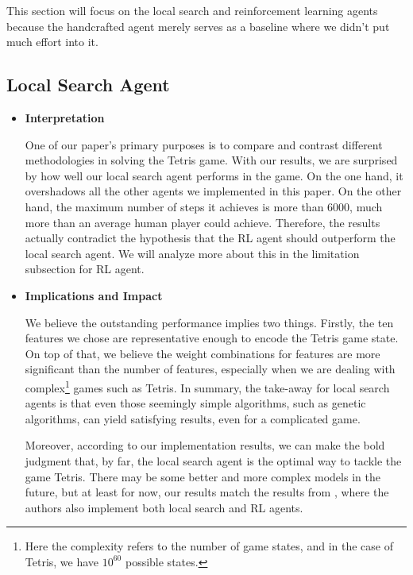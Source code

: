 \documentclass[letterpaper]{article} %
\begin{document}
This section will focus on the local search and reinforcement learning agents because the handcrafted agent merely serves as a baseline where we didn't put much effort into it. 

\subsection{Local Search Agent}
\begin{itemize}
\item \textbf{Interpretation}
  
One of our paper's primary purposes is to compare and contrast different methodologies in solving the Tetris game. With our results, we are surprised by how well our local search agent performs in the game. On the one hand, it overshadows all the other agents we implemented in this paper. On the other hand, the maximum number of steps it achieves is more than 6000, much more than an average human player could achieve. Therefore, the results actually contradict the hypothesis that the RL agent should outperform the local search agent. We will analyze more about this in the limitation subsection for RL agent.

\item \textbf{Implications and Impact}

We believe the outstanding performance implies two things. Firstly, the ten features we chose are representative enough to encode the Tetris game state. On top of that, we believe the weight combinations for features are more significant than the number of features, especially when we are dealing with complex\footnote{Here the complexity refers to the number of game states, and in the case of Tetris, we have $10^{60}$ possible states.} games such as Tetris. In summary, the take-away for local search agents is that even those seemingly simple algorithms, such as genetic algorithms, can yield satisfying results, even for a complicated game.

Moreover, according to our implementation results, we can make the bold judgment that, by far, the local search agent is the optimal way to tackle the game Tetris. There may be some better and more complex models in the future, but at least for now, our results match the results from , where the authors also implement both local search and RL agents.
  


\end{itemize}
\end{document}
